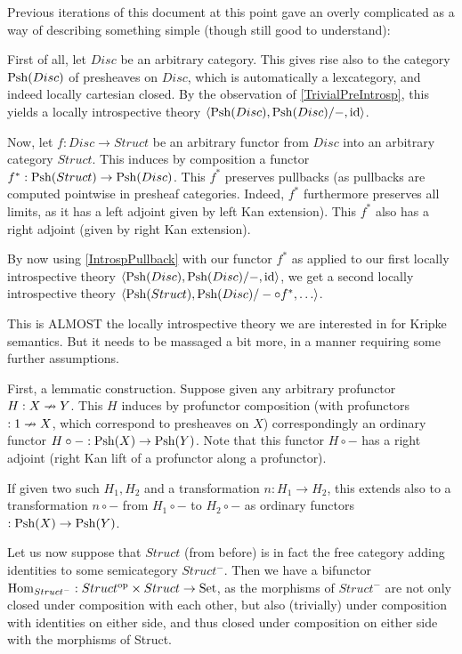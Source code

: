 Previous iterations of this document at this point gave an overly complicated as a way of describing something simple (though still good to understand):

First of all, let $Disc$ be an arbitrary category. This gives rise also to the category $\operatorname{Psh}(Disc)$ of presheaves on $Disc$, which is automatically a lexcategory, and indeed locally cartesian closed. By the observation of \cref{TrivialPreIntrosp}, this yields a locally introspective theory $\langle \operatorname{Psh}(Disc), \operatorname{Psh}(Disc)/-, \mathrm{id} \rangle$.

Now, let $f : Disc \to Struct$ be an arbitrary functor from $Disc$ into an arbitrary category $Struct$. This induces by composition a functor $f^* : \operatorname{Psh}(Struct) \to \operatorname{Psh}(Disc)$. This $f^*$ preserves pullbacks (as pullbacks are computed pointwise in presheaf categories. Indeed, $f^*$ furthermore preserves all limits, as it has a left adjoint given by left Kan extension). This $f^*$ also has a right adjoint (given by right Kan extension).

By now using \cref{IntrospPullback} with our functor $f^*$ as applied to our first locally introspective theory $\langle \operatorname{Psh}(Disc), \operatorname{Psh}(Disc)/-, \mathrm{id} \rangle$, we get a second locally introspective theory $\langle \operatorname{Psh}(Struct), \operatorname{Psh}(Disc)/- \circ f^*, \ldots \rangle$.

This is ALMOST the locally introspective theory we are interested in for Kripke semantics. But it needs to be massaged a bit more, in a manner requiring some further assumptions.

First, a lemmatic construction. Suppose given any arbitrary profunctor $H : X \nrightarrow Y$. This $H$ induces by profunctor composition (with profunctors $:1 \nrightarrow X$, which correspond to presheaves on $X$) correspondingly an ordinary functor $H \circ - : \operatorname{Psh}(X) \to \operatorname{Psh}(Y)$. Note that this functor $H \circ -$ has a right adjoint (right Kan lift of a profunctor along a profunctor).

If given two such $H_1, H_2$ and a transformation $n : H_1 \to H_2$, this extends also to a transformation $n \circ -$ from $H_1 \circ -$ to $H_2 \circ -$ as ordinary functors $: \operatorname{Psh}(X) \to \operatorname{Psh}(Y)$.

Let us now suppose that $Struct$ (from before) is in fact the free category adding identities to some semicategory $Struct^-$. Then we have a bifunctor $\operatorname{Hom}_{Struct^-} : Struct^{\mathrm{op}} \times Struct \to \mathrm{Set}$, as the morphisms of $Struct^-$ are not only closed under composition with each other, but also (trivially) under composition with identities on either side, and thus closed under composition on either side with the morphisms of Struct. 

